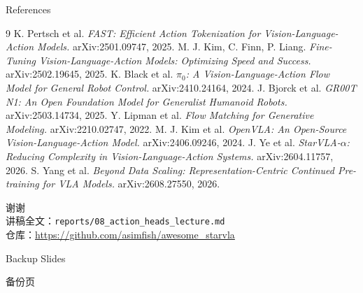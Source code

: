 \documentclass[aspectratio=169,10pt]{beamer}
\begin{document}
\begin{frame}{References}
  \small
  \begin{thebibliography}{9}
     K. Pertsch et al. \emph{FAST: Efficient Action Tokenization for Vision-Language-Action Models.} arXiv:2501.09747, 2025.
     M. J. Kim, C. Finn, P. Liang. \emph{Fine-Tuning Vision-Language-Action Models: Optimizing Speed and Success.} arXiv:2502.19645, 2025.
     K. Black et al. \emph{$\pi_0$: A Vision-Language-Action Flow Model for General Robot Control.} arXiv:2410.24164, 2024.
     J. Bjorck et al. \emph{GR00T N1: An Open Foundation Model for Generalist Humanoid Robots.} arXiv:2503.14734, 2025.
     Y. Lipman et al. \emph{Flow Matching for Generative Modeling.} arXiv:2210.02747, 2022.
     M. J. Kim et al. \emph{OpenVLA: An Open-Source Vision-Language-Action Model.} arXiv:2406.09246, 2024.
     J. Ye et al. \emph{StarVLA-$\alpha$: Reducing Complexity in Vision-Language-Action Systems.} arXiv:2604.11757, 2026.
     S. Yang et al. \emph{Beyond Data Scaling: Representation-Centric Continued Pre-training for VLA Models.} arXiv:2608.27550, 2026.
  \end{thebibliography}
\end{frame}

\begin{frame}
  \begin{center}
    {\Large 谢谢}\\[10pt]
    \normalsize 讲稿全文：\texttt{reports/08\_action\_heads\_lecture.md}\\[4pt]
    \small 仓库：\url{https://github.com/asimfish/awesome_starvla}
  \end{center}
\end{frame}

\appendix
\begin{frame}{Backup Slides}
  \begin{center}\Large 备份页\end{center}
\end{frame}
\end{document}
